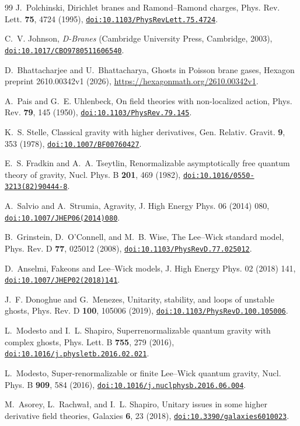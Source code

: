 \documentclass[aps,prd,10pt,twocolumn,superscriptaddress,nofootinbib,floatfix,longbibliography]{revtex4-2}
\newcommand{\doilink}[1]{\href{https://doi.org/#1}{\nolinkurl{doi:#1}}}
\begin{document}
\begin{thebibliography}{99}
J.~Polchinski, Dirichlet branes and Ramond--Ramond charges, Phys. Rev. Lett. \textbf{75}, 4724 (1995), \doilink{10.1103/PhysRevLett.75.4724}.

C.~V. Johnson, \emph{D-Branes} (Cambridge University Press, Cambridge, 2003), \doilink{10.1017/CBO9780511606540}.

D.~Bhattacharjee and U.~Bhattacharya, Ghosts in Poisson brane gases, Hexagon preprint 2610.00342v1 (2026), \url{https://hexagonmath.org/2610.00342v1}.

A.~Pais and G.~E. Uhlenbeck, On field theories with non-localized action, Phys. Rev. \textbf{79}, 145 (1950), \doilink{10.1103/PhysRev.79.145}.

K.~S. Stelle, Classical gravity with higher derivatives, Gen. Relativ. Gravit. \textbf{9}, 353 (1978), \doilink{10.1007/BF00760427}.

E.~S. Fradkin and A.~A. Tseytlin, Renormalizable asymptotically free quantum theory of gravity, Nucl. Phys. B \textbf{201}, 469 (1982), \doilink{10.1016/0550-3213(82)90444-8}.

A.~Salvio and A.~Strumia, Agravity, J. High Energy Phys. 06 (2014) 080, \doilink{10.1007/JHEP06(2014)080}.

B.~Grinstein, D.~O'Connell, and M.~B. Wise, The Lee--Wick standard model, Phys. Rev. D \textbf{77}, 025012 (2008), \doilink{10.1103/PhysRevD.77.025012}.

D.~Anselmi, Fakeons and Lee--Wick models, J. High Energy Phys. 02 (2018) 141, \doilink{10.1007/JHEP02(2018)141}.

J.~F. Donoghue and G.~Menezes, Unitarity, stability, and loops of unstable ghosts, Phys. Rev. D \textbf{100}, 105006 (2019), \doilink{10.1103/PhysRevD.100.105006}.

L.~Modesto and I.~L. Shapiro, Superrenormalizable quantum gravity with complex ghosts, Phys. Lett. B \textbf{755}, 279 (2016), \doilink{10.1016/j.physletb.2016.02.021}.

L.~Modesto, Super-renormalizable or finite Lee--Wick quantum gravity, Nucl. Phys. B \textbf{909}, 584 (2016), \doilink{10.1016/j.nuclphysb.2016.06.004}.

M.~Asorey, L.~Rachwa{\l}, and I.~L. Shapiro, Unitary issues in some higher derivative field theories, Galaxies \textbf{6}, 23 (2018), \doilink{10.3390/galaxies6010023}.


\end{thebibliography}
\end{document}
